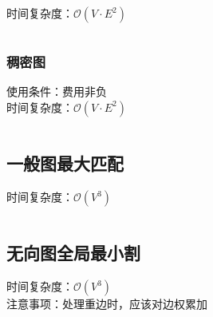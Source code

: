 \documentclass[landscape, oneside, a4paper, cs4size]{book}
\newcommand{\cppcode}[1]{
	\inputminted[mathescape,
	frame=lines,linenos]{cpp}{source/#1}
}
\begin{document}
\begin{multicols}{2}
\begin{spacing}{0.8}
时间复杂度：$\mathcal{O}(V \cdot E^2)$


\cppcode{graph-theory/minimum-cost-flow-spfa.cpp}


\subsubsection{稠密图}


使用条件：费用非负\\

\indent 时间复杂度：$\mathcal{O}(V \cdot E^2)$


\cppcode{graph-theory/minimum-cost-flow-zkw.cpp}


\subsection{一般图最大匹配}


时间复杂度：$\mathcal{O}(V^3)$


\cppcode{graph-theory/maximum-matching-blossom.cpp}


\subsection{无向图全局最小割}


时间复杂度：$\mathcal{O}(V^3)$\\

\indent 注意事项：处理重边时，应该对边权累加


\cppcode{graph-theory/minimum-cut-stoer-wagner.cpp}















\end{spacing}
\end{multicols}
\end{document}
